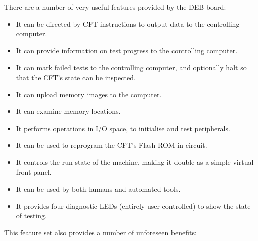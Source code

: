 There are a number of very useful features provided by the \gls{DEB} board:

\begin{itemize}
\item It can be directed by CFT instructions to output data to the
  controlling computer.
\item It can provide information on test progress to the controlling computer.
\item It can mark failed tests to the controlling computer, and optionally halt so that the CFT's state can be inspected.
\item It can upload memory images to the computer.
\item It can examine memory locations.
\item It performs operations in I/O space, to initialise and test peripherals.
\item It can be used to reprogram the CFT's Flash ROM in-circuit.
\item It controls the run state of the machine, making it double as a
  simple virtual front panel.
\item It can be used by both humans and automated tools.
\item It provides four diagnostic LEDs (entirely user-controlled) to
  show the state of testing.
\end{itemize}

This feature set also provides a number of unforeseen benefits:

